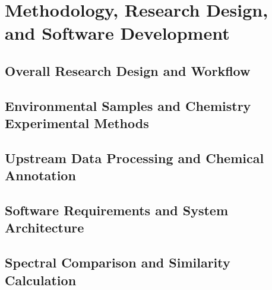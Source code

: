
\chapter{Methodology, Research Design, and Software Development}\label{ch:methodology}

  \section{Overall Research Design and Workflow}\label{sec:research-design}

  \section{Environmental Samples and Chemistry Experimental Methods}\label{sec:environmental-samples}

  \section{Upstream Data Processing and Chemical Annotation}\label{sec:data-processing}

  \section{Software Requirements and System Architecture}\label{sec:software-architecture}

  \section{Spectral Comparison and Similarity Calculation}\label{sec:spectral-similarity}

